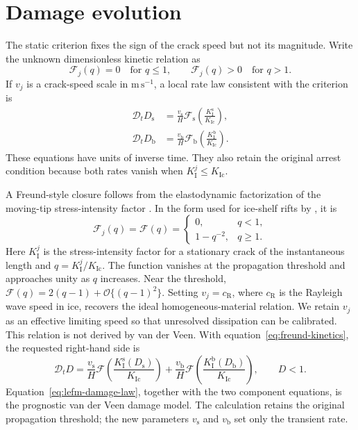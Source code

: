 \documentclass[11pt]{article}
\newcommand{\Dt}{\mathcal{D}_t}
\newcommand{\rms}{\mathrm{s}}
\newcommand{\rmb}{\mathrm{b}}
\newcommand{\KI}[1]{K_{\mathrm{I}}^{#1}}
\newcommand{\KIc}{K_{\mathrm{Ic}}}
\begin{document}
\section{Damage evolution}

The static criterion fixes the sign of the crack speed but not its magnitude.
Write the unknown dimensionless kinetic relation as
\begin{equation}
 \mathcal{F}_j(q)=0\quad\text{for }q\leq1,
 \qquad
 \mathcal{F}_j(q)>0\quad\text{for }q>1.
 \label{eq:general-kinetics}
\end{equation}
If \(v_j\) is a crack-speed scale in
\(\mathrm{m\,s^{-1}}\), a local rate law consistent with the
criterion is
\begin{align}
 \Dt D_{\rms}
 &=\frac{v_{\rms}}{H}
   \mathcal{F}_{\rms}\left(\frac{\KI{\rms}}{\KIc}\right),
 \label{eq:surface-rate-general}\\
 \Dt D_{\rmb}
 &=\frac{v_{\rmb}}{H}
   \mathcal{F}_{\rmb}\left(\frac{\KI{\rmb}}{\KIc}\right).
 \label{eq:basal-rate-general}
\end{align}
These equations have units of inverse time.  They also retain the original
arrest condition because both rates vanish when \(\KI{j}\leq\KIc\).

A Freund-style closure follows from the elastodynamic factorization of the
moving-tip stress-intensity factor \citep{freund1990}.  In the form used for
ice-shelf rifts by \citet{lipovsky2018}, it is
\begin{equation}
 \mathcal{F}_j(q)=\mathcal{F}(q)
 =\begin{cases}
   0, & q<1,\\
   1-q^{-2}, & q\geq1.
  \end{cases}
 \label{eq:freund-kinetics}
\end{equation}
Here \(\KI{j}\) is the stress-intensity factor for a stationary crack of the
instantaneous length and \(q=\KI{j}/\KIc\).  The function vanishes at the
propagation threshold and approaches unity as \(q\) increases.  Near the
threshold, \(\mathcal{F}(q)=2(q-1)+\mathcal{O}\{(q-1)^2\}\).  Setting
\(v_j=c_{\mathrm{R}}\), where \(c_{\mathrm{R}}\) is the Rayleigh wave speed in
ice, recovers the ideal homogeneous-material relation.  We retain \(v_j\) as
an effective limiting speed so that unresolved dissipation can be calibrated.
This relation is not derived by van der Veen.  With
equation~\eqref{eq:freund-kinetics}, the requested right-hand side is
\begin{equation}
 \boxed{
 \Dt D
 =\frac{v_{\rms}}{H}
  \mathcal{F}\left(\frac{\KI{\rms}(D_{\rms})}{\KIc}\right)
 +\frac{v_{\rmb}}{H}
  \mathcal{F}\left(\frac{\KI{\rmb}(D_{\rmb})}{\KIc}\right),
 \qquad D<1.
 }
 \label{eq:lefm-damage-law}
\end{equation}
Equation~\eqref{eq:lefm-damage-law}, together with the two component
equations, is the prognostic van der Veen damage model.  The calculation
retains the original propagation threshold; the new parameters
\(v_{\rms}\) and \(v_{\rmb}\) set only the transient rate.
\end{document}
